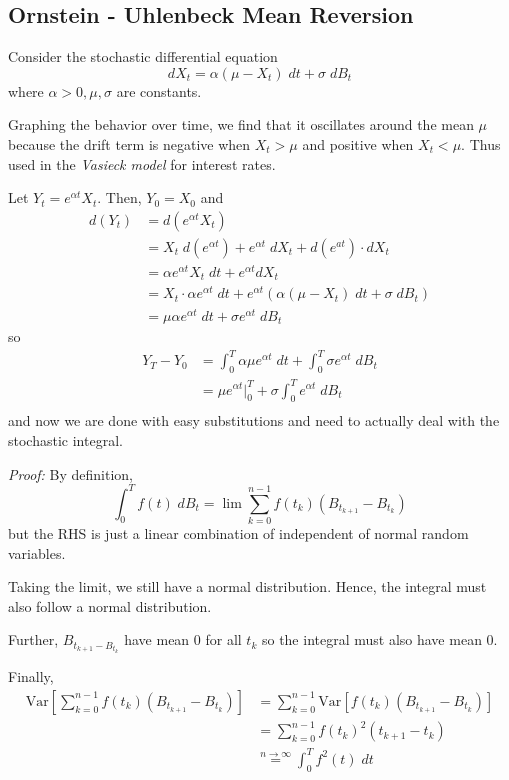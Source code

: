 \documentclass[12pt]{report}
\newcommand{\Var}{\text{Var}}
\newenvironment*{tbox}[2][gray]{
    \begin{tcolorbox}[
        parbox=false,
        colback=#1!5!white,
        colframe=#1!75!black,
        breakable,
        title={#2}
    ]}
    {\end{tcolorbox}}
\begin{document}
\subsection{Ornstein - Uhlenbeck Mean Reversion}
    Consider the stochastic differential equation 
    \[dX_t = \alpha(\mu - X_t) \; dt + \sigma \; dB_t\]
    where $\alpha > 0, \mu, \sigma$ are constants. 
    
    Graphing the behavior over time, we find that it oscillates around the mean $\mu$ because the drift term is negative when $X_t > \mu$ and positive when $X_t < \mu$. Thus used in the \emph{Vasieck model} for interest rates.

    Let $Y_t = e^{\alpha t} X_t$. Then, $Y_0 = X_0$ and 
    \begin{align*}
        d(Y_t) &= d(e^{\alpha t} X_t)\\ 
            &= X_t \; d(e^{\alpha t}) + e^{\alpha t} \; dX_t + d(e^{at}) \cdot dX_t\\ 
            &= \alpha e^{\alpha t} X_t \; dt + e^{\alpha t} dX_t\\ 
            &= X_t \cdot \alpha e^{\alpha t} \; dt + e^{\alpha t} \left(\alpha(\mu - X_t) \; dt + \sigma \; dB_t\right)\\
            &= \mu \alpha e^{\alpha t}\; dt + \sigma e^{\alpha t} \; dB_t
    \end{align*}
    so 
    \begin{align*}
        Y_T - Y_0 &= \int_0^T \alpha \mu e^{\alpha t}\; dt + \int_0^T \sigma e^{\alpha t}\; dB_t\\ 
            &= \mu e^{\alpha t} \bigg\vert_0^T + \sigma \int_0^T e^{\alpha t}\; dB_t\\
    \end{align*}
    and now we are done with easy substitutions and need to actually deal with the stochastic integral. 

    \begin{tbox}{\textbf{Lemma:} Let $f(t)$ be a deterministic function. Then 
        \[\int_0^T f(t)\; dB_t \sim N\left(0, \int_0^T f^2(t)\; dt\right)\] }
        \emph{Proof:} By definition, 
        \[\int_0^T f(t) \; dB_t = \lim \sum_{k=0}^{n-1} f(t_k) (B_{t_{k+1}} - B_{t_k})\]
        but the RHS is just a linear combination of independent of normal random variables. 

        Taking the limit, we still have a normal distribution. Hence, the integral must also follow a normal distribution. 

        Further, $B_{t_{k+1} - B_{t_k}}$ have mean $0$ for all $t_k$ so the integral must also have mean $0$. 

        Finally, 
        \begin{align*}
            \Var\left[\sum_{k=0}^{n-1} f(t_k) (B_{t_{k+1}} - B_{t_k})\right] &= \sum_{k=0}^{n-1} \Var\left[f(t_k) (B_{t_{k+1}} - B_{t_k})\right]\\
            &= \sum_{k=0}^{n-1} f(t_k)^2 (t_{k+1} - t_k)\\ 
            &\overset{n \to \infty}{=} \int_0^T f^2(t)\; dt
        \end{align*}
    \end{tbox}
\end{document}
